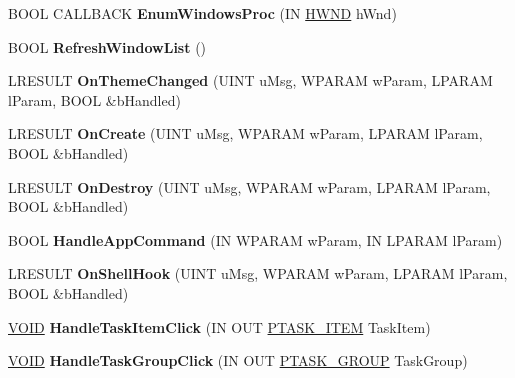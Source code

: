 \begin{DoxyCompactItemize}
B\+O\+OL C\+A\+L\+L\+B\+A\+CK {\bfseries Enum\+Windows\+Proc} (IN \hyperlink{interfacevoid}{H\+W\+ND} h\+Wnd)
\item 
\mbox{\label{class_c_task_switch_wnd_a8dcc863d8fab0992233ca4795de6c3e4}} 
B\+O\+OL {\bfseries Refresh\+Window\+List} ()
\item 
\mbox{\label{class_c_task_switch_wnd_ac6372995097b08f619f268cf6bd02351}} 
L\+R\+E\+S\+U\+LT {\bfseries On\+Theme\+Changed} (U\+I\+NT u\+Msg, W\+P\+A\+R\+AM w\+Param, L\+P\+A\+R\+AM l\+Param, B\+O\+OL \&b\+Handled)
\item 
\mbox{\label{class_c_task_switch_wnd_ab7520c76fc9b510c80616b7f2727d423}} 
L\+R\+E\+S\+U\+LT {\bfseries On\+Create} (U\+I\+NT u\+Msg, W\+P\+A\+R\+AM w\+Param, L\+P\+A\+R\+AM l\+Param, B\+O\+OL \&b\+Handled)
\item 
\mbox{\label{class_c_task_switch_wnd_aa45ecba38344f103d4476e1c9844b5e4}} 
L\+R\+E\+S\+U\+LT {\bfseries On\+Destroy} (U\+I\+NT u\+Msg, W\+P\+A\+R\+AM w\+Param, L\+P\+A\+R\+AM l\+Param, B\+O\+OL \&b\+Handled)
\item 
\mbox{\label{class_c_task_switch_wnd_a050c3c3a3185172c1c34a15761c61be8}} 
B\+O\+OL {\bfseries Handle\+App\+Command} (IN W\+P\+A\+R\+AM w\+Param, IN L\+P\+A\+R\+AM l\+Param)
\item 
\mbox{\label{class_c_task_switch_wnd_a6fa8f75de38de7a8420e7167442f7890}} 
L\+R\+E\+S\+U\+LT {\bfseries On\+Shell\+Hook} (U\+I\+NT u\+Msg, W\+P\+A\+R\+AM w\+Param, L\+P\+A\+R\+AM l\+Param, B\+O\+OL \&b\+Handled)
\item 
\mbox{\label{class_c_task_switch_wnd_adb85f79176d8a89100037a6f43d38b36}} 
\hyperlink{interfacevoid}{V\+O\+ID} {\bfseries Handle\+Task\+Item\+Click} (IN O\+UT \hyperlink{struct___t_a_s_k___i_t_e_m}{P\+T\+A\+S\+K\+\_\+\+I\+T\+EM} Task\+Item)
\item 
\mbox{\label{class_c_task_switch_wnd_ac9ca2cdb8fe6a218ea26e297b551d0c8}} 
\hyperlink{interfacevoid}{V\+O\+ID} {\bfseries Handle\+Task\+Group\+Click} (IN O\+UT \hyperlink{struct___t_a_s_k___g_r_o_u_p}{P\+T\+A\+S\+K\+\_\+\+G\+R\+O\+UP} Task\+Group)

\end{DoxyCompactItemize}
